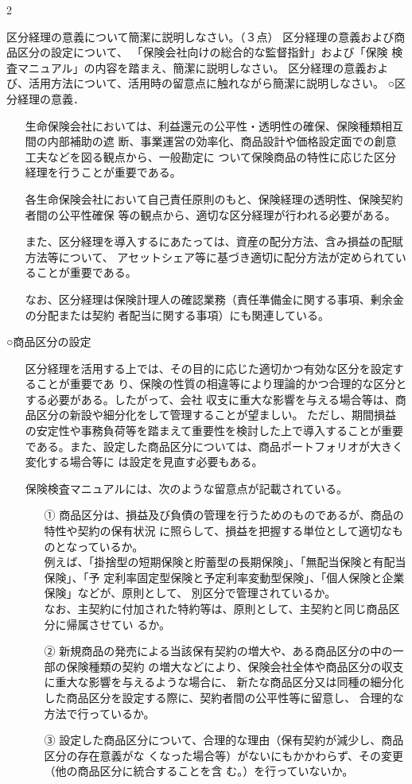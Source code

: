 2\documentclass[report,gutter=10mm,fore-edge=10mm,uplatex,dvipdfmx]{jlreq}
\begin{document}
区分経理の意義について簡潔に説明しなさい。（３点）
区分経理の意義および商品区分の設定について、
「保険会社向けの総合的な監督指針」および「保険
検査マニュアル」の内容を踏まえ、簡潔に説明しなさい。
区分経理の意義および、活用方法について、活用時の留意点に触れながら簡潔に説明しなさい。
\answer{}
\noindent ○区分経理の意義．
\begin{itemize}
\item[] 生命保険会社においては、利益還元の公平性・透明性の確保、保険種類相互間の内部補助の遮
 断、事業運営の効率化、商品設計や価格設定面での創意工夫などを図る観点から、一般勘定に
 ついて保険商品の特性に応じた区分経理を行うことが重要である。
\item[] 各生命保険会社において自己責任原則のもと、保険経理の透明性、保険契約者間の公平性確保
 等の観点から、適切な区分経理が行われる必要がある。
\item[] また、区分経理を導入するにあたっては、資産の配分方法、含み損益の配賦方法等について、
 アセットシェア等に基づき適切に配分方法が定められていることが重要である。
\item[] なお、区分経理は保険計理人の確認業務（責任準備金に関する事項、剰余金の分配または契約
 者配当に関する事項）にも関連している。
\end{itemize}
\noindent ○商品区分の設定
\begin{itemize}
\item[] 区分経理を活用する上では、その目的に応じた適切かつ有効な区分を設定することが重要であ
 り、保険の性質の相違等により理論的かつ合理的な区分とする必要がある。したがって、会社
 収支に重大な影響を与える場合等は、商品区分の新設や細分化をして管理することが望ましい。
 ただし、期間損益の安定性や事務負荷等を踏まえて重要性を検討した上で導入することが重要
 である。また、設定した商品区分については、商品ポートフォリオが大きく変化する場合等に
 は設定を見直す必要もある。
\item[] 保険検査マニュアルには、次のような留意点が記載されている。
\begin{itemize}
\item[①] 商品区分は、損益及び負債の管理を行うためのものであるが、商品の特性や契約の保有状況
に照らして、損益を把握する単位として適切なものとなっているか。\\
 例えば、「掛捨型の短期保険と貯蓄型の長期保険」、「無配当保険と有配当保険」、「予
 定利率固定型保険と予定利率変動型保険」、「個人保険と企業保険」などが、原則として、
 別区分で管理されているか。\\
 なお、主契約に付加された特約等は、原則として、主契約と同じ商品区分に帰属させてい
 るか。
\item[②] 新規商品の発売による当該保有契約の増大や、ある商品区分の中の一部の保険種類の契約
 の増大などにより、保険会社全体や商品区分の収支に重大な影響を与えるような場合に、
 新たな商品区分又は同種の細分化した商品区分を設定する際に、契約者間の公平性等に留意し、
合理的な方法で行っているか。
\item[③] 設定した商品区分について、合理的な理由（保有契約が減少し、商品区分の存在意義がな
 くなった場合等）がないにもかかわらず、その変更（他の商品区分に統合することを含
 む。）を行っていないか。
\end{itemize}
\end{itemize}
\end{document}
